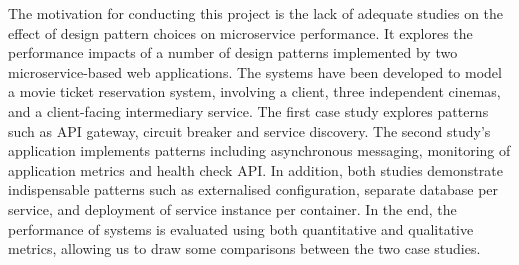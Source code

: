 The motivation for conducting this project is the lack of adequate studies on the effect of design pattern choices on microservice performance. It explores the performance impacts of a number of design patterns implemented by two microservice-based web applications. The systems have been developed to model a movie ticket reservation system, involving a client, three independent cinemas, and a client-facing intermediary service. The first case study explores patterns such as API gateway, circuit breaker and service discovery. The second study's application implements patterns including asynchronous messaging, monitoring of application metrics and health check API. In addition, both studies demonstrate indispensable patterns such as externalised configuration, separate database per service, and deployment of service instance per container. In the end, the performance of systems is evaluated using both quantitative and qualitative metrics, allowing us to draw some comparisons between the two case studies.

